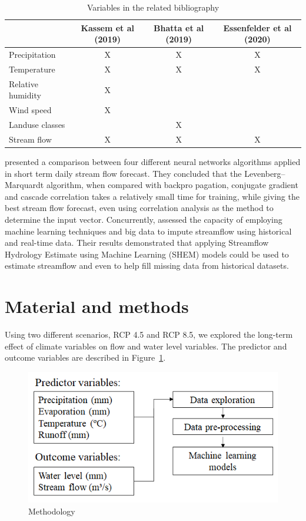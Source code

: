 \documentclass[12pt]{article}
\begin{document}
\begin{table}[htbp]
\centering
\caption{Variables in the related bibliography}
\label{tab:variables-literature}
    \begin{tabulary}{\textwidth}{lCCC}
        \toprule
           & Kassem et al (2019) & Bhatta et al (2019) & Essenfelder et al (2020) \\
        \midrule
            Precipitation & X & X & X \\
            Temperature & X & X & X \\
            Relative humidity & X &  & \\
            Wind speed  & X &  & \\
            Landuse classes  &  & X & \\
            Stream flow  & X & X & X \\
        \bottomrule
    \end{tabulary}
\end{table}

\cite{kicsi2007streamflow} presented a comparison between four different neural networks algorithms applied in short term daily stream flow forecast. They concluded that the Levenberg–Marquardt algorithm, when compared with backpro pagation, conjugate gradient and cascade correlation takes a relatively small time for training, while giving the best stream flow forecast, even using correlation analysis as the method to determine the input vector. Concurrently, \cite{petty2018streamflow} assessed the capacity of employing machine learning techniques and big data to impute streamflow using historical and real-time data. Their results demonstrated that applying Streamflow Hydrology Estimate using Machine Learning (SHEM) models could be used to estimate streamflow and even to help fill missing data from historical datasets.

\section{Material and methods}
Using two different scenarios, RCP 4.5 and RCP 8.5, we explored the long-term effect of climate variables on flow and water level variables. The predictor and outcome variables are described in Figure~\ref{fig:approach}.

\begin{figure}[htbp]
  \centering
  \includegraphics[width=0.5\linewidth]{Figures/approach.png}
  \caption{Methodology}
  \label{fig:approach}
\end{figure}
\end{document}
